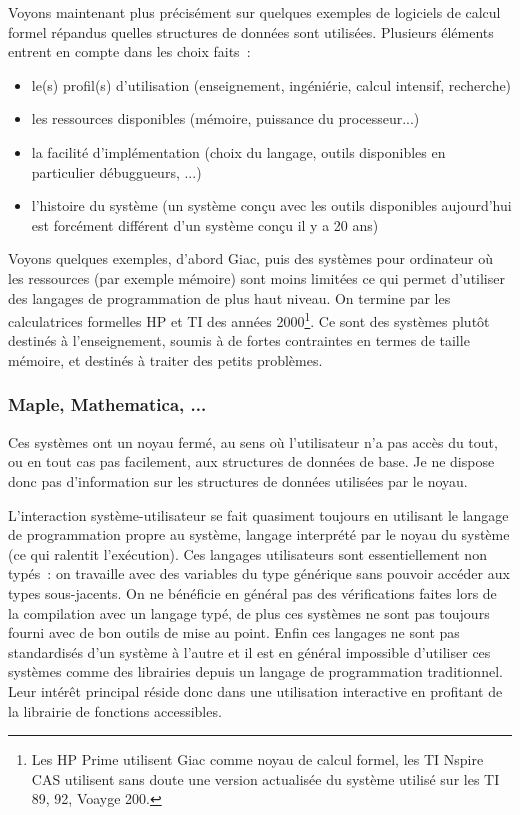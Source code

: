 \documentclass[a4paper,11pt]{article}
\begin{document}
Voyons maintenant plus précisément sur quelques exemples de logiciels
de calcul formel r\'epandus quelles structures de données sont
utilisées. Plusieurs \'el\'ements entrent en compte dans les choix faits~:
\begin{itemize}
\item le(s) profil(s) d'utilisation (enseignement, ing\'eni\'erie,
calcul intensif, recherche)
\item les ressources disponibles (m\'emoire, puissance du processeur...)
\item la facilit\'e d'impl\'ementation (choix du langage, outils
disponibles en particulier d\'ebuggueurs, ...)
\item l'histoire du syst\`eme (un syst\`eme conçu avec les outils
disponibles aujourd'hui est forc\'ement diff\'erent d'un syst\`eme 
conçu il y a 20 ans)
\end{itemize}
Voyons quelques exemples, d'abord Giac, puis des syst\`emes 
pour ordinateur où les ressources
(par exemple m\'emoire) sont moins limit\'ees ce qui permet 
d'utiliser des langages de programmation de plus haut niveau.
On termine par les calculatrices formelles
HP et TI des ann\'ees 2000\footnote{Les HP Prime utilisent Giac comme
  noyau de calcul formel, les TI Nspire CAS utilisent sans doute une
  version actualis\'ee du syst\`eme utilis\'e sur les TI 89, 92,
  Voayge 200.}.
Ce sont des systèmes plutôt destinés à l'enseignement, soumis 
\`a de fortes contraintes en termes de taille m\'emoire, et destinés
à traiter des petits problèmes.


\subsubsection{Maple, Mathematica, ...}
Ces syst\`emes ont un noyau ferm\'e, au sens o\`u l'utilisateur n'a pas
acc\`es du tout, ou en tout cas pas facilement, aux structures de donn\'ees
de base. Je ne dispose donc pas d'information sur les structures de donn\'ees
utilis\'ees par le noyau.

L'interaction système-utilisateur se fait quasiment toujours en utilisant le
langage de programmation propre au syst\`eme, langage interpr\'et\'e
par le noyau du syst\`eme (ce qui ralentit l'exécution). Ces langages 
utilisateurs sont essentiellement
non typ\'es~: on travaille avec des variables du type générique sans pouvoir
accéder aux types sous-jacents. On ne bénéficie en g\'en\'eral pas des
v\'erifications faites lors de la compilation avec un langage typé,
de plus ces systèmes ne sont pas toujours fourni avec de bon outils de 
mise au point. Enfin ces langages ne sont pas standardisés d'un
système à l'autre et il est en général impossible
d'utiliser ces systèmes comme des librairies depuis un langage
de programmation traditionnel. Leur intérêt principal réside donc
dans une utilisation interactive en profitant de la librairie de 
fonctions accessibles.
\end{document}

